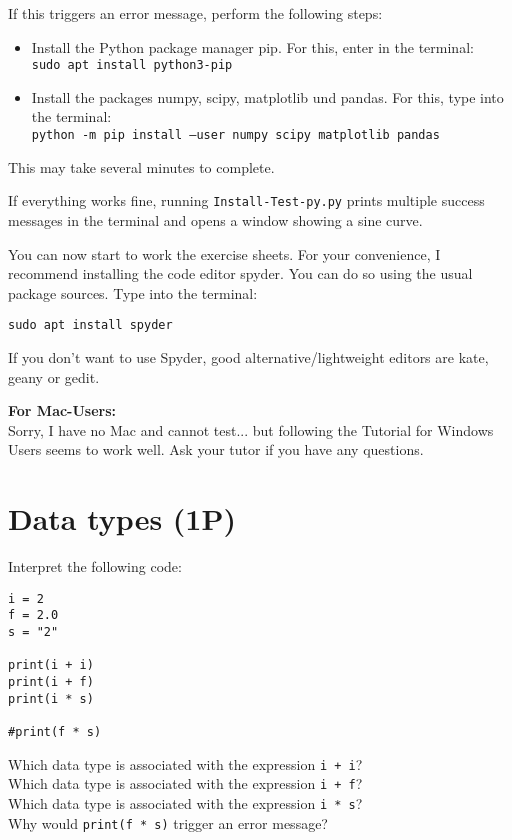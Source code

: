 \documentclass[
	english,
	fontsize=10pt,
	parskip=half,
	titlepage=true,
	DIV=12
]{scrartcl}
\newcommand*{\inPy}[1]{\texttt{#1}}
\begin{document}
If this triggers an error message, perform the following steps:
\begin{itemize}
\item Install the Python package manager pip. For this, enter in the terminal:\\
	\texttt{sudo apt install python3-pip}
\item Install the packages numpy, scipy, matplotlib und pandas. For this, type into the terminal:\\
	\texttt{python -m pip install --user numpy scipy matplotlib pandas}
\end{itemize}
This may take several minutes to complete.

If everything works fine, running \texttt{Install-Test-py.py} prints multiple success messages in the terminal and opens a window showing a sine curve.

You can now start to work the exercise sheets. For your convenience, I recommend installing the code editor spyder. You can do so using the usual package sources. Type into the terminal:
\begin{center}
\texttt{sudo apt install spyder}
\end{center}

If you don't want to use Spyder, good alternative/lightweight editors are kate, geany or gedit.

\textbf{For Mac-Users:}\\
Sorry, I have no Mac and cannot test... but following the Tutorial for Windows Users seems to work well. Ask your tutor if you have any questions.


\section{Data types (1\;P)}
Interpret the following code:
\begin{verbatim}
i = 2
f = 2.0
s = "2"

print(i + i)
print(i + f)
print(i * s)

#print(f * s)
\end{verbatim}

Which data type is associated with the expression \inPy{i + i}?\\
Which data type is associated with the expression \inPy{i + f}?\\
Which data type is associated with the expression \inPy{i * s}?\\
Why would \inPy{print(f * s)} trigger an error message?
\end{document}
